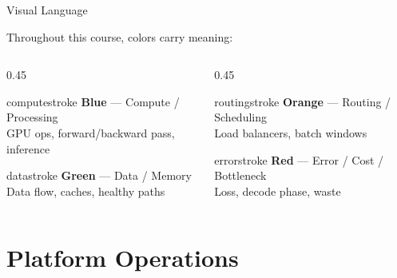 \documentclass[aspectratio=169, 12pt]{beamer}
\begin{document}
\begin{frame}{Visual Language}

\small
Throughout this course, colors carry meaning:

\vspace{0.3cm}
\begin{columns}[T]
  \begin{column}{0.45\textwidth}
    \begin{mlsyscard}{computestroke}
    \textbf{Blue} --- Compute / Processing\\
    {\footnotesize GPU ops, forward/backward pass, inference}
    \end{mlsyscard}
    \vspace{0.15cm}
    \begin{mlsyscard}{datastroke}
    \textbf{Green} --- Data / Memory\\
    {\footnotesize Data flow, caches, healthy paths}
    \end{mlsyscard}
  \end{column}
  \begin{column}{0.45\textwidth}
    \begin{mlsyscard}{routingstroke}
    \textbf{Orange} --- Routing / Scheduling\\
    {\footnotesize Load balancers, batch windows}
    \end{mlsyscard}
    \vspace{0.15cm}
    \begin{mlsyscard}{errorstroke}
    \textbf{Red} --- Error / Cost / Bottleneck\\
    {\footnotesize Loss, decode phase, waste}
    \end{mlsyscard}
  \end{column}
\end{columns}
\end{frame}



\section{Platform Operations}
\end{document}
